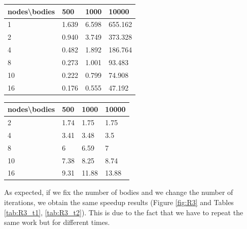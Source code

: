 \documentclass[a4paper]{article}
\begin{document}
\begin{minipage}[b]{.40\textwidth}
  \centering
  \begin{tabular}{l|l|l|l}
  \centering
nodes\textbackslash bodies & 500 & 1000 & 10000 \\ \hline
1 & 1.639 & 6.598 & 655.162 \\ \hline
2 & 0.940 & 3.749 & 373.328 \\ \hline
4 & 0.482 & 1.892 & 186.764 \\ \hline
8 & 0.273 & 1.001 & 93.483 \\ \hline
10 & 0.222 & 0.799 & 74.908 \\ \hline
16 & 0.176 & 0.555 & 47.192 \\ 
    \hline
  \end{tabular}
  \label{tab:R2_t1}
\end{minipage} \qquad
\begin{minipage}[b]{.40\textwidth}
  \centering
  \begin{tabular}{l|l|l|l}
nodes\textbackslash bodies & 500 & 1000 & 10000 \\ \hline
2 & 1.74 & 1.75 & 1.75 \\ \hline
4 & 3.41 & 3.48 & 3.5 \\ \hline
8 & 6 & 6.59 & 7 \\ \hline
10 & 7.38 & 8.25 & 8.74 \\ \hline
16 & 9.31 & 11.88 & 13.88 \\ 
  \hline
  \end{tabular}
  \label{tab:R2_t2}
\end{minipage}	


As expected, if we fix the number of bodies and we change the number of iterations, we obtain the same speedup results (Figure \ref{fig:R3} and Tables \ref{tab:R3_t1}, \ref{tab:R3_t2}). This is due to the fact that we have to repeat the same work but for different times.
\end{document}
